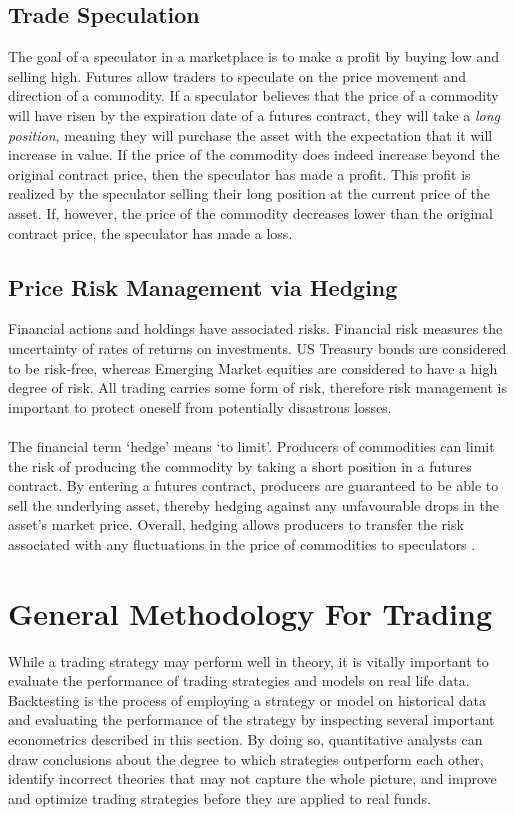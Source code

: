 \subsection{Trade Speculation}
The goal of a speculator in a marketplace is to make a profit by buying low and selling high. Futures allow traders to speculate on the price movement and direction of a commodity. If a speculator believes that the price of a commodity will have risen by the expiration date of a futures contract, they will take a \emph{long position}, meaning they will purchase the asset with the expectation that it will increase in value. If the price of the commodity does indeed increase beyond the original contract price, then the speculator has made a profit. This profit is realized by the speculator selling their long position at the current price of the asset. If, however, the price of the commodity decreases lower than the original contract price, the speculator has made a loss. 
\subsection{Price Risk Management via Hedging}
Financial actions and holdings have associated risks. Financial risk measures the uncertainty of rates of returns on investments. US Treasury bonds are considered to be risk-free, whereas Emerging Market equities are considered to have a high degree of risk. All trading carries some form of risk, therefore  risk management is important to protect oneself from potentially disastrous losses. \\ \\
The financial term `hedge' means `to limit'. Producers of commodities can limit the risk of producing the commodity by taking a short position in a futures contract. By entering a futures contract, producers are guaranteed to be able to sell the underlying asset, thereby hedging against any unfavourable drops in the asset's market price. Overall, hedging allows producers to transfer the risk associated with any fluctuations in the price of commodities to speculators \cite{hedge_futures}. 

\section{General Methodology For Trading}
While a trading strategy may perform well in theory, it is vitally important to evaluate the performance of trading strategies and models on real life data. Backtesting is the process of employing a strategy or model on historical data and evaluating the performance of the strategy by inspecting several important econometrics described in this section. By doing so, quantitative analysts can draw conclusions about the degree to which strategies outperform each other, identify incorrect theories that may not capture the whole picture, and improve and optimize trading strategies before they are applied to real funds.

